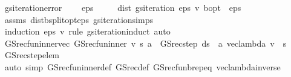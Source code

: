 \begin{isabellebody}
\ gs{\isacharunderscore}{\kern0pt}iteration{\isacharunderscore}{\kern0pt}error{\isacharcolon}{\kern0pt}\ \isanewline
\ \ \ {\isachardoublequoteopen}eps\ {\isachargreater}{\kern0pt}\ {}{\isachardoublequoteclose}\isanewline
\ \ \ {\isachardoublequoteopen}dist\ {\isacharparenleft}{\kern0pt}gs{\isacharunderscore}{\kern0pt}iteration\ eps\ v{\isacharparenright}{\kern0pt}\ {\isasymnu}\isactrlsub b{\isacharunderscore}{\kern0pt}opt\ {\isacharless}{\kern0pt}\ eps\ {\isacharslash}{\kern0pt}\ {}{\isachardoublequoteclose}\isanewline
%
\isadelimproof
\ \ %
\endisadelimproof
%
\isatagproof
{}\isamarkupfalse%
\ assms\ dist{\isacharunderscore}{\kern0pt}{\isasymL}\isactrlsub b{\isacharunderscore}{\kern0pt}split{\isacharunderscore}{\kern0pt}opt{\isacharunderscore}{\kern0pt}eps\ gs{\isacharunderscore}{\kern0pt}iteration{\isachardot}{\kern0pt}simps\isanewline
\ \ \isamarkupfalse%
\ {\isacharparenleft}{\kern0pt}induction\ eps\ v\ rule{\isacharcolon}{\kern0pt}\ gs{\isacharunderscore}{\kern0pt}iteration{\isachardot}{\kern0pt}induct{\isacharparenright}{\kern0pt}\ auto%
\endisatagproof
{\isafoldproof}%
%
\isadelimproof
\isanewline
%
\endisadelimproof
\isanewline
\isanewline
{}\isamarkupfalse%
\ GS{\isacharunderscore}{\kern0pt}rec{\isacharunderscore}{\kern0pt}fun{\isacharunderscore}{\kern0pt}inner{\isacharunderscore}{\kern0pt}vec{\isacharcolon}{\kern0pt}\ {\isachardoublequoteopen}GS{\isacharunderscore}{\kern0pt}rec{\isacharunderscore}{\kern0pt}fun{\isacharunderscore}{\kern0pt}inner\ v\ s\ a\ {\isacharequal}{\kern0pt}\ GS{\isacharunderscore}{\kern0pt}rec{\isacharunderscore}{\kern0pt}step\ {\isacharparenleft}{\kern0pt}d{\isacharparenleft}{\kern0pt}s\ {\isacharcolon}{\kern0pt}{\isacharequal}{\kern0pt}\ a{\isacharparenright}{\kern0pt}{\isacharparenright}{\kern0pt}\ {\isacharparenleft}{\kern0pt}vec{\isacharunderscore}{\kern0pt}lambda\ v{\isacharparenright}{\kern0pt}\ {\isachardollar}{\kern0pt}\ s{\isachardoublequoteclose}\isanewline
%
\isadelimproof
\ \ %
\endisadelimproof
%
\isatagproof
{}\isamarkupfalse%
\ GS{\isacharunderscore}{\kern0pt}rec{\isacharunderscore}{\kern0pt}step{\isacharunderscore}{\kern0pt}elem\isanewline
\ \ \isamarkupfalse%
\ {\isacharparenleft}{\kern0pt}auto\ simp{\isacharcolon}{\kern0pt}\ GS{\isacharunderscore}{\kern0pt}rec{\isacharunderscore}{\kern0pt}fun{\isacharunderscore}{\kern0pt}inner{\isacharunderscore}{\kern0pt}def\ GS{\isacharunderscore}{\kern0pt}rec{\isacharunderscore}{\kern0pt}def\ GS{\isacharunderscore}{\kern0pt}rec{\isacharunderscore}{\kern0pt}fun\isactrlsub b{\isachardot}{\kern0pt}rep{\isacharunderscore}{\kern0pt}eq\ vec{\isacharunderscore}{\kern0pt}lambda{\isacharunderscore}{\kern0pt}inverse{\isacharparenright}{\kern0pt}%

\end{isabellebody}
